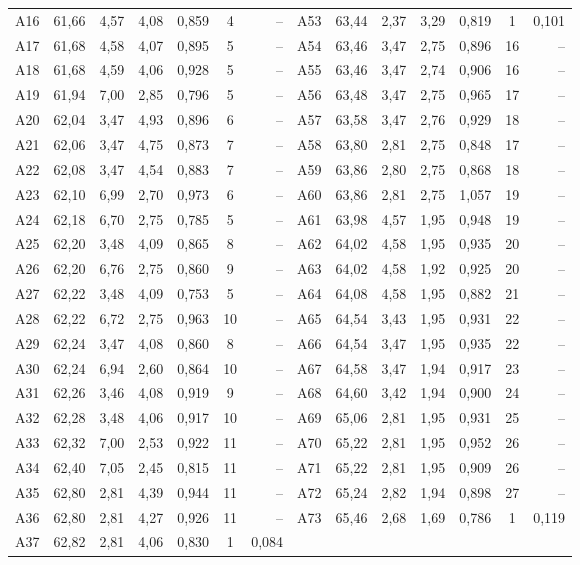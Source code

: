 \begin{tabular}{l r r r r c r @{\hspace{1.2em}} l r r r r c r}
A16 & 61{,}66 & 4{,}57 & 4{,}08 & 0{,}859 & 4 & -- & A53 & 63{,}44 & 2{,}37 & 3{,}29 & 0{,}819 & 1 & 0{,}101 \\
A17 & 61{,}68 & 4{,}58 & 4{,}07 & 0{,}895 & 5 & -- & A54 & 63{,}46 & 3{,}47 & 2{,}75 & 0{,}896 & 16 & -- \\
A18 & 61{,}68 & 4{,}59 & 4{,}06 & 0{,}928 & 5 & -- & A55 & 63{,}46 & 3{,}47 & 2{,}74 & 0{,}906 & 16 & -- \\
A19 & 61{,}94 & 7{,}00 & 2{,}85 & 0{,}796 & 5 & -- & A56 & 63{,}48 & 3{,}47 & 2{,}75 & 0{,}965 & 17 & -- \\
A20 & 62{,}04 & 3{,}47 & 4{,}93 & 0{,}896 & 6 & -- & A57 & 63{,}58 & 3{,}47 & 2{,}76 & 0{,}929 & 18 & -- \\
A21 & 62{,}06 & 3{,}47 & 4{,}75 & 0{,}873 & 7 & -- & A58 & 63{,}80 & 2{,}81 & 2{,}75 & 0{,}848 & 17 & -- \\
A22 & 62{,}08 & 3{,}47 & 4{,}54 & 0{,}883 & 7 & -- & A59 & 63{,}86 & 2{,}80 & 2{,}75 & 0{,}868 & 18 & -- \\
A23 & 62{,}10 & 6{,}99 & 2{,}70 & 0{,}973 & 6 & -- & A60 & 63{,}86 & 2{,}81 & 2{,}75 & 1{,}057 & 19 & -- \\
A24 & 62{,}18 & 6{,}70 & 2{,}75 & 0{,}785 & 5 & -- & A61 & 63{,}98 & 4{,}57 & 1{,}95 & 0{,}948 & 19 & -- \\
A25 & 62{,}20 & 3{,}48 & 4{,}09 & 0{,}865 & 8 & -- & A62 & 64{,}02 & 4{,}58 & 1{,}95 & 0{,}935 & 20 & -- \\
A26 & 62{,}20 & 6{,}76 & 2{,}75 & 0{,}860 & 9 & -- & A63 & 64{,}02 & 4{,}58 & 1{,}92 & 0{,}925 & 20 & -- \\
A27 & 62{,}22 & 3{,}48 & 4{,}09 & 0{,}753 & 5 & -- & A64 & 64{,}08 & 4{,}58 & 1{,}95 & 0{,}882 & 21 & -- \\
A28 & 62{,}22 & 6{,}72 & 2{,}75 & 0{,}963 & 10 & -- & A65 & 64{,}54 & 3{,}43 & 1{,}95 & 0{,}931 & 22 & -- \\
A29 & 62{,}24 & 3{,}47 & 4{,}08 & 0{,}860 & 8 & -- & A66 & 64{,}54 & 3{,}47 & 1{,}95 & 0{,}935 & 22 & -- \\
A30 & 62{,}24 & 6{,}94 & 2{,}60 & 0{,}864 & 10 & -- & A67 & 64{,}58 & 3{,}47 & 1{,}94 & 0{,}917 & 23 & -- \\
A31 & 62{,}26 & 3{,}46 & 4{,}08 & 0{,}919 & 9 & -- & A68 & 64{,}60 & 3{,}42 & 1{,}94 & 0{,}900 & 24 & -- \\
A32 & 62{,}28 & 3{,}48 & 4{,}06 & 0{,}917 & 10 & -- & A69 & 65{,}06 & 2{,}81 & 1{,}95 & 0{,}931 & 25 & -- \\
A33 & 62{,}32 & 7{,}00 & 2{,}53 & 0{,}922 & 11 & -- & A70 & 65{,}22 & 2{,}81 & 1{,}95 & 0{,}952 & 26 & -- \\
A34 & 62{,}40 & 7{,}05 & 2{,}45 & 0{,}815 & 11 & -- & A71 & 65{,}22 & 2{,}81 & 1{,}95 & 0{,}909 & 26 & -- \\
A35 & 62{,}80 & 2{,}81 & 4{,}39 & 0{,}944 & 11 & -- & A72 & 65{,}24 & 2{,}82 & 1{,}94 & 0{,}898 & 27 & -- \\
A36 & 62{,}80 & 2{,}81 & 4{,}27 & 0{,}926 & 11 & -- & A73 & 65{,}46 & 2{,}68 & 1{,}69 & 0{,}786 & 1 & 0{,}119 \\
A37 & 62{,}82 & 2{,}81 & 4{,}06 & 0{,}830 & 1 & 0{,}084 &  &  &  &  &  &  &  \\
\bottomrule
\end{tabular}
